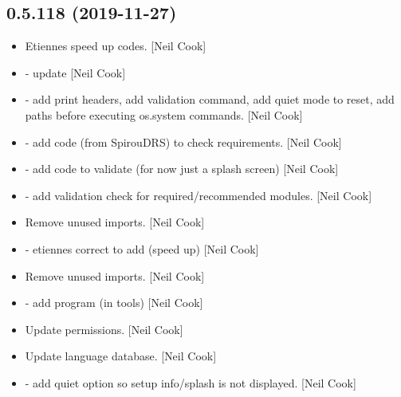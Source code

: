 \documentclass[a4paper,10pt,english]{report}
\begin{document}
\subsection{0.5.118 (2019-11-27)}
\label{\detokenize{misc/changelog:id24}}\begin{itemize}
\item {} 
Etiennes speed up codes. {[}Neil Cook{]}

\item {} 
 - update  {[}Neil Cook{]}

\item {} 
 - add print headers, add
validation command, add quiet mode to reset, add paths before
executing os.system commands. {[}Neil Cook{]}

\item {} 
 - add code (from SpirouDRS) to check
requirements. {[}Neil Cook{]}

\item {} 
 - add code to validate (for now just a splash
screen) {[}Neil Cook{]}

\item {} 
 - add validation check for required/recommended
modules. {[}Neil Cook{]}

\item {} 
Remove unused imports. {[}Neil Cook{]}

\item {} 
 - etiennes correct to
add (speed up) {[}Neil Cook{]}

\item {} 
Remove unused imports. {[}Neil Cook{]}

\item {} 
 - add 
program (in tools) {[}Neil Cook{]}

\item {} 
Update permissions. {[}Neil Cook{]}

\item {} 
Update language database. {[}Neil Cook{]}

\item {} 
 - add quiet option so setup info/splash is not
displayed. {[}Neil Cook{]}


\end{itemize}
\end{document}
